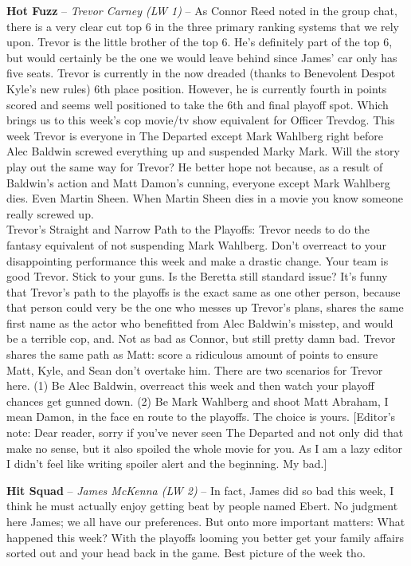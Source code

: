 \documentclass[11pt,letterpaper]{article}
\begin{document}
\begin{etaremune}
\item \textbf{Hot Fuzz} -- \textit{Trevor Carney (LW 1)} -- As Connor Reed noted in the group chat, there is a very clear cut top 6 in the three primary ranking systems that we rely upon. Trevor is the little brother of the top 6. He's definitely part of the top 6, but would certainly be the one we would leave behind since James' car only has five seats. Trevor is currently in the now dreaded (thanks to Benevolent Despot Kyle's new rules) 6th place position. However, he is currently fourth in points scored and seems well positioned to take the 6th and final playoff spot. Which brings us to this week's cop movie/tv show equivalent for Officer Trevdog. This week Trevor is everyone in The Departed except Mark Wahlberg right before Alec Baldwin screwed everything up and suspended Marky Mark. Will the story play out the same way for Trevor? He better hope not because, as a result of Baldwin's action and Matt Damon's cunning, everyone except Mark Wahlberg dies. Even Martin Sheen. When Martin Sheen dies in a movie you know someone really screwed up. 
\medskip\\Trevor's Straight and Narrow Path to the Playoffs: Trevor needs to do the fantasy equivalent of not suspending Mark Wahlberg. Don't overreact to your disappointing performance this week and make a drastic change. Your team is good Trevor. Stick to your guns. Is the Beretta still standard issue? 
It's funny that Trevor's path to the playoffs is the exact same as one other person, because that person could very be the one who messes up Trevor's plans, shares the same first name as the actor who benefitted from Alec Baldwin's misstep, and would be a terrible cop, and. Not as bad as Connor, but still pretty damn bad. Trevor shares the same path as Matt: score a ridiculous amount of points to ensure Matt, Kyle, and Sean don't overtake him. There are two scenarios for Trevor here. (1) Be Alec Baldwin, overreact this week and then watch your playoff chances get gunned down. (2) Be Mark Wahlberg and shoot Matt Abraham, I mean Damon, in the face en route to the playoffs. The choice is yours.  
[Editor's note: Dear reader, sorry if you've never seen The Departed and not only did that make no sense, but it also spoiled the whole movie for you. As I am a lazy editor I didn't feel like writing spoiler alert and the beginning. My bad.]
\item \textbf{Hit Squad} -- \textit{James McKenna (LW 2)} -- In fact, James did so bad this week, I think he must actually enjoy getting beat by people named Ebert. No judgment here James; we all have our preferences. But onto more important matters: What happened this week? With the playoffs looming you better get your family affairs sorted out and your head back in the game. Best picture of the week tho.

\end{etaremune}
\end{document}
